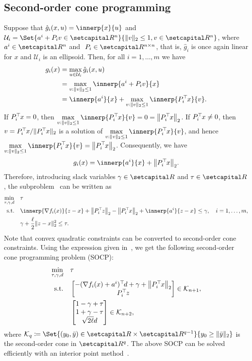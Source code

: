 \documentclass[../../main]{subfiles}
\begin{document}
\subsection{Second-order cone programming} 
Suppose that $\hat{g}_i (x,u) = \innerp{x}{u}$ and ${\mathcal{U}}_i = \Set{ a^i + P_i v \in \setR^n }{ \norm{v}_2 \leq 1, v \in \setR^n }$, where $a^i \in \setR^n$ and $\ P_i \in \setR^{n \times n}$, that is, $\hat{g}_i$ is once again linear for $x$ and $\mathcal{U}_i$ is an ellipsoid.
Then, for all $i = 1,\dots,m$ we have
\begin{align}
g_i (x) &=  \max_{u \in {\mathcal{U}}_i } \hat{g}_i (x,u) \\
&=\max_{v : \norm{v}_2 \leq 1} \innerp{a^i + P_i v}{x} \\
&= \innerp{a^i}{x} + \max_{v : \norm{v}_2 \leq 1} \innerp{P_i^\T x}{v}.
\end{align}
If $P_i^\T x = 0$, then $\displaystyle \max_{v : \norm{v}_2 \leq 1} \innerp{P_i^\T x}{v} = 0 = \norm*{P_i^\T x}_2$.
If $P_i^\T x \neq 0$, then $v = P_i^\T x / \norm{P_i^\T x}_2$ is a solution of $\displaystyle \max_{v : \norm{v}_2 \leq 1} \innerp{P_i^\T x}{v}$, and hence $\displaystyle \max_{v : \norm{v}_2 \leq 1} \innerp{P_i^\T x}{v} = \norm*{P_i^\T x}_2$.
Consequently, we have
\begin{equation}
	g_i(x) = \innerp{a^i}{x} + \norm*{P_i^\T x}_2.
\end{equation}
Therefore, introducing slack variables $\gamma \in \setR$ and $\tau \in \setR$, the subproblem~ can be written as
\begin{equation}
    \begin{aligned}
    \min_{\tau, \gamma, d} \quad   &\tau \\ 
    \st    \quad   &\innerp{\nabla f_i(x)}{z - x} + \norm*{P_i^\T z}_2 - \norm*{P_i^\T x}_2 + \innerp{a^i}{z - x} \leq \gamma, \quad i = 1,\ldots,m, \\
    & \gamma + \frac{\ell}{2} \norm{z - x}_2^2 \leq \tau.
    \end{aligned}
\end{equation}
Note that convex quadratic constraints can be converted to second-order cone constraints.
Using the expression given in~\cite[Section 2.1]{Alizadeh2003}, we get the following second-order cone programming problem (SOCP):
\begin{equation}\label{eq:socp}
\begin{aligned}
\min_{\tau, \gamma, d} \quad   &\tau \\ 
\st    \quad   &\begin{bmatrix} -(\nabla f_i(x) + a^i)^\T d + \gamma + \norm*{P_i^\T x}_2 \\
P_i^\T z
\end{bmatrix} \in \mathcal{K}_{n + 1}, \\
& \begin{bmatrix} 1 - \gamma + \tau \\
1 + \gamma - \tau \\
\sqrt{2 \ell} d
\end{bmatrix} \in \mathcal{K}_{n + 2},
\end{aligned}
\end{equation}
where $\mathcal{K}_q \coloneqq \Set{(y_0, \bar{y}) \in \setR \times \setR^{q - 1} }{ y_0 \geq \norm{ \bar{y} }_2}$ is the second-order cone in $\setR^{q}$.
The above SOCP can be solved efficiently with an interior point method~\cite{Alizadeh2003}.
\end{document}
